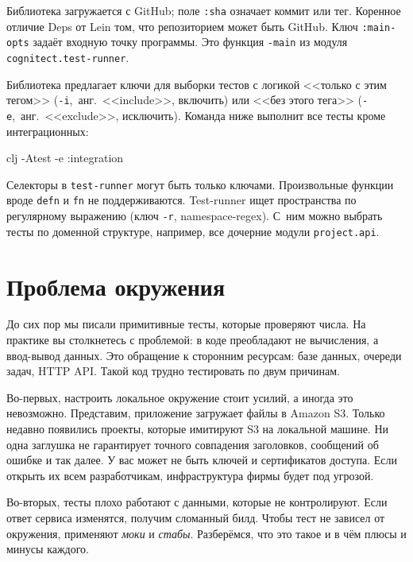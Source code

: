 Библиотека загружается с GitHub; поле \verb|:sha| означает коммит или
тег. Коренное отличие Deps от Lein том, что репозиторием может быть GitHub. Ключ
\verb|:main-opts| задаёт входную точку программы. Это функция \verb|-main|
из модуля \verb|cognitect.test-runner|.

Библиотека предлагает ключи для выборки тестов с логикой <<только с этим тегом>>
(\verb|-i|,~анг.~<<include>>, включить) или <<без этого тега>>
(\verb|-e|,~анг.~<<exclude>>, исключить). Команда ниже выполнит все тесты кроме
интеграционных:

\begin{english}
  \begin{bash}
clj -Atest -e :integration
  \end{bash}
\end{english}

Селекторы в \verb|test-runner| могут быть только ключами. Произвольные функции
вроде \verb|defn| и \verb|fn| не поддерживаются. Test-runner ищет пространства
по регулярному выражению (ключ \verb|-r|, namespace-regex). С~ним можно выбрать
тесты по доменной структуре, например, все дочерние модули \verb|project.api|.

\section{Проблема окружения}


До сих пор мы писали примитивные тесты, которые проверяют числа. На практике вы
столкнетесь с проблемой: в коде преобладают не вычисления, а ввод-вывод
данных. Это обращение к сторонним ресурсам: базе данных, очереди задач, HTTP
API. Такой код трудно тестировать по двум причинам.


Во-первых, настроить локальное окружение стоит усилий, а иногда это
невозможно. Представим, приложение загружает файлы в Amazon S3. Только недавно
появились проекты, которые имитируют S3 на локальной машине. Ни одна заглушка не
гарантирует точного совпадения заголовков, сообщений об ошибке и так далее. У
вас может не быть ключей и сертификатов доступа. Если открыть их всем
разработчикам, инфраструктура фирмы будет под угрозой.

Во-вторых, тесты плохо работают с данными, которые не контролируют. Если ответ
сервиса изменятся, получим сломанный билд. Чтобы тест не зависел от окружения,
применяют \emph{моки} и \emph{стабы}. Разберёмся, что это такое и в чём плюсы и
минусы каждого.

